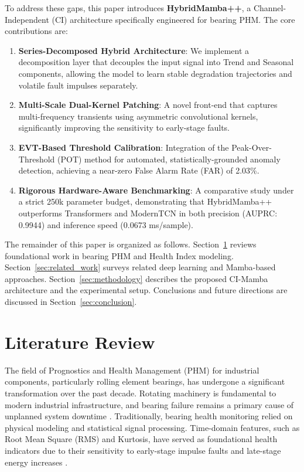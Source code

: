\documentclass{ieeeaccess}
\begin{document}
{To address these gaps, this paper introduces \textbf{HybridMamba++}, a Channel-Independent (CI) architecture specifically engineered for bearing PHM. The core contributions are:
\begin{enumerate}
    \item \textbf{Series-Decomposed Hybrid Architecture}: We implement a decomposition layer that decouples the input signal into Trend and Seasonal components, allowing the model to learn stable degradation trajectories and volatile fault impulses separately.
    \item \textbf{Multi-Scale Dual-Kernel Patching}: A novel front-end that captures multi-frequency transients using asymmetric convolutional kernels, significantly improving the sensitivity to early-stage faults.
    \item \textbf{EVT-Based Threshold Calibration}: Integration of the Peak-Over-Threshold (POT) method for automated, statistically-grounded anomaly detection, achieving a near-zero False Alarm Rate (FAR) of 2.03\%.
    \item \textbf{Rigorous Hardware-Aware Benchmarking}: A comparative study under a strict 250k parameter budget, demonstrating that HybridMamba++ outperforms Transformers and ModernTCN in both precision (AUPRC: 0.9944) and inference speed (0.0673 ms/sample).
\end{enumerate}

The remainder of this paper is organized as follows. Section~\ref{sec:lit_review} reviews foundational work in bearing PHM and Health Index modeling. Section~\ref{sec:related_work} surveys related deep learning and Mamba-based approaches. Section~\ref{sec:methodology} describes the proposed CI-Mamba architecture and the experimental setup. Conclusions and future directions are discussed in Section~\ref{sec:conclusion}.

\section{Literature Review}
\label{sec:lit_review}

The field of Prognostics and Health Management (PHM) for industrial components, particularly rolling element bearings, has undergone a significant transformation over the past decade. Rotating machinery is fundamental to modern industrial infrastructure, and bearing failure remains a primary cause of unplanned system downtime \cite{lei2018machinery}. Traditionally, bearing health monitoring relied on physical modeling and statistical signal processing. Time-domain features, such as Root Mean Square (RMS) and Kurtosis, have served as foundational health indicators due to their sensitivity to early-stage impulse faults and late-stage energy increases \cite{randall2011rolling}.

}
\end{document}
